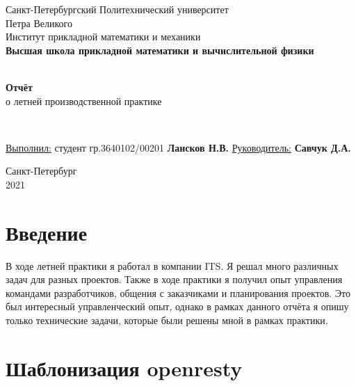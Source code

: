 \documentclass[a4papaer,12pt]{article}
\begin{document}
\begin{titlepage}
	\center
		Санкт-Петербургский Политехнический
		университет \\ Петра Великого\\
		Институт прикладной математики и механики
		\\ \textbf{Высшая школа прикладной математики и вычислительной физики}

	\vfill ~
	\textbf{
		\\ \large Отчёт
	}
    \\ о летней производственной практике 

	\vfill ~

    \begin{flushleft}
    \underline{Выполнил:}  \hspace{\fill} студент гр.3640102/00201 \textbf{Лансков Н.В.} \linebreak[2]
	\underline{Руководитель:} \hspace{\fill} \textbf{Савчук Д.А.} \\
    \end{flushleft}

\vfill

{\large}	Санкт-Петербург
\\ 2021
\end{titlepage}

\tableofcontents

\section{Введение}
В ходе летней практики я работал в компании ITS. Я решал много различных задач для разных проектов. Также 
в ходе практики я получил опыт управления командами разработчиков, общения с заказчиками и планирования проектов.
Это был интересный управленческий опыт, однако в рамках данного отчёта я опишу только технические задачи, 
которые были решены мной в рамках практики.

\section{Шаблонизация openresty}
\end{document}
